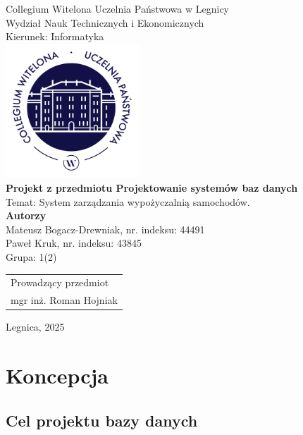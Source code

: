 \documentclass[12pt,a4paper]{article}
\begin{document}
\begin{titlepage}
\begin{center}
\large
{\noindent Collegium Witelona Uczelnia Państwowa w Legnicy}\\
{\noindent Wydział Nauk Technicznych i Ekonomicznych}\\
{\noindent Kierunek: Informatyka}\\[2cm]
\includegraphics[width=5cm]{godlo.jpg}\\[2cm]
{\large\textbf{Projekt z przedmiotu Projektowanie systemów baz danych}}\\[0.3cm]
{\noindent Temat: System zarządzania wypożyczalnią samochodów.}\\[3cm]
{\large\textbf{Autorzy}}\\
Mateusz Bogacz-Drewniak, nr. indeksu: 44491\\
Paweł Kruk, nr. indeksu: 43845\\[0.3cm]
Grupa: 1(2)\\[3cm]
\end{center}

\begin{flushright}
\begin{tabular}{l}
Prowadzący przedmiot\\
mgr inż. Roman Hojniak
\end{tabular}
\end{flushright}

\vfill
\begin{center}
{\noindent Legnica, 2025}
\end{center}
\end{titlepage}

\tableofcontents

\newpage

\section{Koncepcja}

\subsection{Cel projektu bazy danych}
\end{document}
